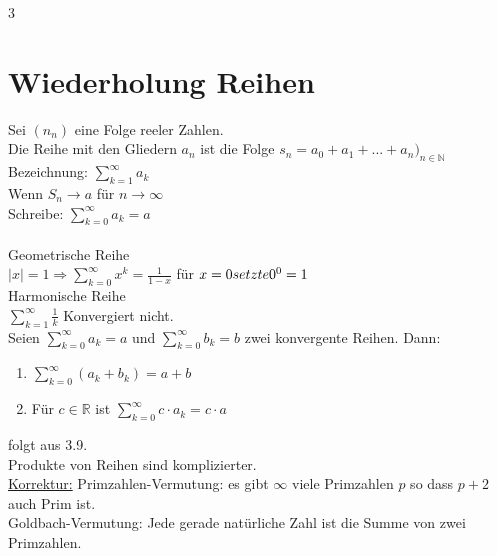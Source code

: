 
\setcounter{chapter}3

\section*{Wiederholung Reihen}
Sei $(n_n)$ eine Folge reeler Zahlen.\\
Die Reihe mit den Gliedern $a_n$ ist die Folge $s_n = a_0 + a_1 + ... + a_n)_{n \in \mathbb{N}}$ \\
Bezeichnung: $\sum\limits_{k=1}^{\infty} a_k$\\
Wenn $S_n \to a$ für $n \to \infty$\\
Schreibe: $\sum\limits_{k = 0}^{\infty} a_k = a$\\
\\
\bsp Geometrische Reihe\\
$|x| = 1 \Rightarrow \displaystyle\sum\limits_{k = 0}^{\infty} x^k = \frac{1}{1-x}$ für $x = 0 setzte 0^0 = 1\\ $\\
Harmonische Reihe\\
$\displaystyle\sum\limits_{k = 1}^{\infty} \frac{1}{k}$ Konvergiert nicht.\\
Seien $\sum\limits_{k = 0}^{\infty} a_k = a$ und $\sum\limits_{k = 0}^{\infty} b_k = b$ zwei konvergente Reihen. Dann:
\begin{enumerate}
\item{$\sum\limits_{k = 0}^{\infty} (a_k + b_k) = a + b$}
\item{Für $c \in \mathbb{R}$ ist $\sum\limits_{k = 0}^{\infty} c \cdot a_k = c \cdot a$}
\end{enumerate}
\bew folgt aus 3.9.\\
\bem Produkte von Reihen sind komplizierter.\\
\underline{Korrektur:}
Primzahlen-Vermutung: es gibt $\infty$ viele Primzahlen $p$ so dass $p + 2$ auch Prim ist.\\
Goldbach-Vermutung: Jede gerade natürliche Zahl ist die Summe von zwei Primzahlen.\\
